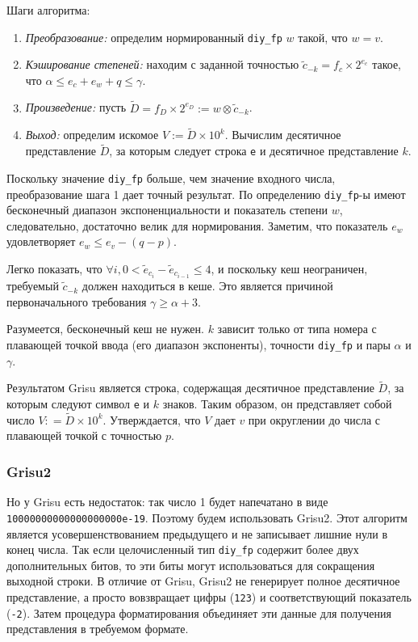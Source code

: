 \documentclass[a4paper, 12pt, twoside]{article}
\begin{document}
Шаги алгоритма:
\begin{enumerate}
\item \textit{Преобразование:} определим нормированный \texttt{diy\_fp} $w$ такой, что $w = v$.
\item \textit{Кэширование степеней:} находим с заданной точностью $\tilde{c}_{-k} = f_c \times 2^{e_c}$ такое, что $\alpha \leqslant e_c + e_w + q \leqslant \gamma$.
\item \textit{Произведение:} пусть $\tilde{D} = f_D \times 2^{e_D} := w \otimes \tilde{c}_{-k}$.
\item \textit{Выход:} определим искомое $V := \tilde{D} \times 10^k$. 
Вычислим десятичное представление $\tilde{D}$, за которым следует строка \texttt{e} и десятичное представление $k$.
\end{enumerate}
Поскольку значение \texttt{diy\_fp} больше, чем значение входного числа, преобразование шага 1 дает точный результат. 
По определению \texttt{diy\_fp}-ы имеют бесконечный диапазон экспоненциальности и показатель степени $w$, следовательно, достаточно велик для нормирования. 
Заметим, что показатель $e_w$ удовлетворяет $e_w \leqslant e_v - (q - p)$. 

Легко показать, что $\forall i, 0 < \tilde{e}_{c_i} - \tilde{e}_{c_{i-1}} \leqslant 4$, и поскольку кеш неограничен, требуемый $\tilde{c}_{-k}$ должен находиться в кеше. 
Это является причиной первоначального требования $\gamma \geqslant \alpha + 3$.

Разумеется, бесконечный кеш не нужен. 
$k$ зависит только от типа номера с плавающей точкой ввода (его диапазон экспоненты), точности \texttt{diy\_fp} и пары $\alpha$ и $\gamma$.

Результатом \textsf{Grisu} является строка, содержащая десятичное представление $\tilde{D}$, за которым следуют символ \texttt{e} и $k$ знаков. 
Таким образом, он представляет собой число $V: = \tilde{D} \times 10^k$. 
Утверждается, что $V$ дает $v$ при округлении до числа с плавающей точкой с точностью $p$.

\subsubsection{\textsf{Grisu2}}
Но у \textsf{Grisu} есть недостаток: так число 1 будет напечатано в виде \\ \texttt{10000000000000000000e-19}.
Поэтому будем использовать \textsf{Grisu2}.
Этот алгоритм является усовершенствованием предыдущего и не записывает лишние нули в конец числа.
Так если целочисленный тип \texttt{diy\_fp} содержит более двух дополнительных битов, то эти биты могут использоваться для сокращения выходной строки.
В отличие от \textsf{Grisu}, \textsf{Grisu2} не генерирует полное десятичное представление, а просто вовзвращает цифры (\texttt{123}) и соответствующий показатель (\texttt{-2}). 
Затем процедура форматирования объединяет эти данные для получения представления в требуемом формате.
\end{document}
